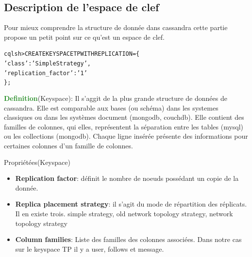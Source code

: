 \subsection{Description de l'espace de clef}
\par Pour mieux comprendre la structure de donnée dans cassandra
cette partie propose un petit point sur ce qu'est un espace de clef.

\begin{tt}
\begin{alltt}
cqlsh> CREATE KEYSPACE TP WITH REPLICATION = \{
\indent		'class' : 'SimpleStrategy',
\indent		'replication\_factor' : '1'
\};
\end{alltt}
\end{tt}

\textcolor{ForestGreen}{\textbf{Definition}}(Keyspace): Il s'aggit de la plus grande 
structure de données de cassandra. Elle est comparable aux bases (ou schéma)
dans les systemes classiques ou dans les systèmes document (mongodb, couchdb). Elle contient des familles de colonnes,  qui elles, représentent
la séparation entre les tables (mysql) ou les collections (mongodb). Chaque ligne insérée présente des informations pour certaines colonnes
d'un famille de colonnes.

\begin{block}{Propriétées(Keyspace)}
\begin{itemize}
\item \textbf{Replication factor}: définit le nombre de noeuds possédant un copie de la donnée. 
\item \textbf{Replica placement strategy}: il s'agit du mode de répartition des réplicats. Il en 
existe trois. simple strategy,  old network topology strategy, network topology strategy
\item \textbf{Column families}: Liste des familles des colonnes associées. Dans notre cas sur le keyspace
TP il y a user, follows et message.
\end{itemize}
\end{block}

